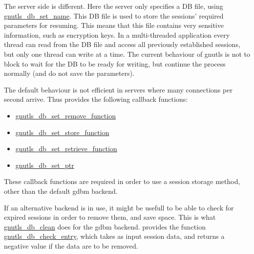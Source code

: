 \par
The server side is different.
Here the server only specifies a DB file, using 
\hyperref{gnutls\_db\_set\_name()}{gnutls\_db\_set\_name() (see Section }{)}{gnutls_db_set_name}.
This DB file is used to store the sessions' required parameters for
resuming. This means that this file contains very sensitive information,
such as encryption keys. In a multi-threaded application every thread can
read from the DB file and access all previously established sessions, but
only one thread can write at a time. The current behaviour of gnutls is
not to block to wait for the DB to be ready for writing, but continue the
process normally (and do not save the parameters).  
\par
The default behaviour is not efficient in servers where many connections
per second arrive. Thus
 \gnutls{} provides the following callback functions:
\begin{itemize}
\item \hyperref{gnutls\_db\_set\_remove\_function()}{gnutls\_db\_set\_remove\_function() (see Section }{)}
{gnutls_db_set_remove_function}
\item \hyperref{gnutls\_db\_set\_store\_function()}{gnutls\_db\_set\_store\_function() (see Section }{)}
{gnutls_db_set_store_function}
\item \hyperref{gnutls\_db\_set\_retrieve\_function()}{gnutls\_db\_set\_retrieve\_function() (see Section }{)
}{gnutls_db_set_retrieve_function}
\item \hyperref{gnutls\_db\_set\_ptr()}{gnutls\_db\_set\_ptr() (see Section }{)}
{gnutls_db_set_ptr}
\end{itemize}

These callback functions are required in order to use a session
storage method, other than the default gdbm backend. 
\par
If an alternative backend is in use, it might be usefull to be able to check
for expired sessions in order to remove them, and save space. This is what
\hyperref{gnutls\_db\_clean()}{gnutls\_db\_clean() (see Section }{)}
{gnutls_db_clean} does for the gdbm backend. 
\gnutls{} provides the function
\hyperref{gnutls\_db\_check\_entry()}{gnutls\_db\_check\_entry() (see Section }{)
}{gnutls_db_check_entry}, which takes as input session data, and
returns a negative value if the data are to be removed.

